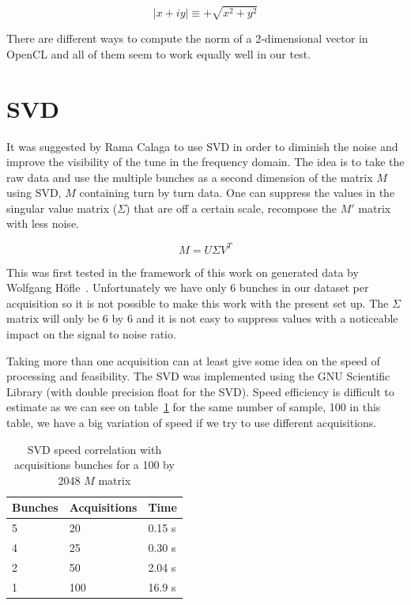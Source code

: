 $$ \mid x + i y \mid \equiv +\sqrt{x^2 + y^2}$$ 

There are different ways to compute the norm of a 2-dimensional vector in \gls{OpenCL} and all of them seem to work equally well in our test.

\section{SVD}
\label{sec:SVD}

It was suggested by Rama Calaga to use \gls{SVD} in order to diminish the noise and improve the visibility of the tune in the frequency domain. The idea is to take the raw data and use the multiple bunches as a second dimension of the matrix $M$ using SVD, $M$ containing turn by turn data. One can suppress the values in the singular value matrix ($\Sigma$) that are off a certain scale, recompose the $M'$ matrix with less noise.

$$M = U \Sigma V^{T}$$ 

This was first tested in the framework of this work on generated data by Wolfgang H{\"o}f\/le~\cite{HofleEvian10}. Unfortunately we have only 6 bunches in our dataset per acquisition so it is not possible to make this work with the present set up. The $\Sigma$ matrix will only be 6 by 6 and it is not easy to suppress values with a noticeable impact on the signal to noise ratio.

Taking more than one acquisition can at least give some idea on the speed of processing and feasibility. The SVD was implemented using the GNU Scientific Library (with double precision float for the SVD). Speed efficiency is difficult to estimate as we can see on table~\ref{tab:SVD} for the same number of sample, 100 in this table, we have a big variation of speed if we try to use different acquisitions.

\begin{table}[H]
\caption{SVD speed correlation with acquisitions bunches for a 100 by 2048 $M$ matrix}
\label{tab:SVD}
\centering
\begin{tabular}{|l|l|l|}
\hline
Bunches & Acquisitions & Time \\
\hline
5 & 20 & 0.15 s \\
4 & 25 & 0.30 s \\
2 & 50 & 2.04 s \\
1 & 100 & 16.9 s \\
\hline
\end{tabular}
\end{table}

